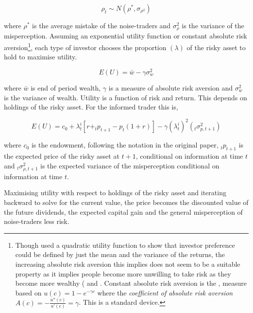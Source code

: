 \documentclass[12pt, a4paper, oneside]{article} %
\begin{document}
\begin{equation}
\rho_t \sim N(\rho^*, \sigma_{\rho^2})
\end{equation}

where $\rho^*$ is the average mistake of the noise-traders and $\sigma_{\rho}^2$ is the variance of the misperception.      Assuming an exponential utility function or constant absolute risk aversion\footnote{Though \citep{TobinLiquidity} used a quadratic utility function to show that investor preference could be defined by just the mean and the variance of the returns, the increasing absolute risk aversion this implies does not seem to be a suitable property as it implies people become more unwilling to take risk as they become more wealthy (\citep{Hicks1962} and \citep{ArrowRisk}.   Constant absolute risk aversion is the \citep{PrattCARA}, \citep{ArrowRisk}  measure based on $u(c) = 1 - e^{-\gamma c}$ where the \emph{coefficient of absolute risk aversion} $A(c) = -\frac{u''(c)}{u'(c)} = \gamma$.  This is a standard device.}, each type of investor chooses the proportion $(\lambda)$ of the risky asset to hold to maximise utility.  

\begin{equation}
E(U) = \bar{w} - \gamma \sigma_{w}^2
\end{equation} 

where $\bar{w}$ is end of period wealth, $\gamma$ is a measure of absolute risk aversion and $\sigma_w^2$ is the variance of wealth. Utility is a function of risk and return.  This depends on holdings of the risky asset.   For the informed trader this is,  

\begin{equation}
E(U) = c_0 + \lambda_t^i[r + _tp_{t+1} - p_t(1 + r)] - \gamma (\lambda_t^i)^2 \left (_t\sigma^2_{p, t+1} \right ) 
\end{equation}

where $c_0$ is the endowment, following the notation in the original paper, $_tp_{t+1}$ is the expected price of the risky asset at $t + 1$, conditional on information at time $t$ and $_t\sigma^2_{\rho, t+1}$ is the expected variance of the misperception conditional on information at time $t$. 



Maximising utility with respect to holdings of the risky asset and iterating backward to solve for the current value,  the price becomes the discounted value of the future dividends, the expected capital gain and the general misperception of noise-traders less risk.  
\end{document}
